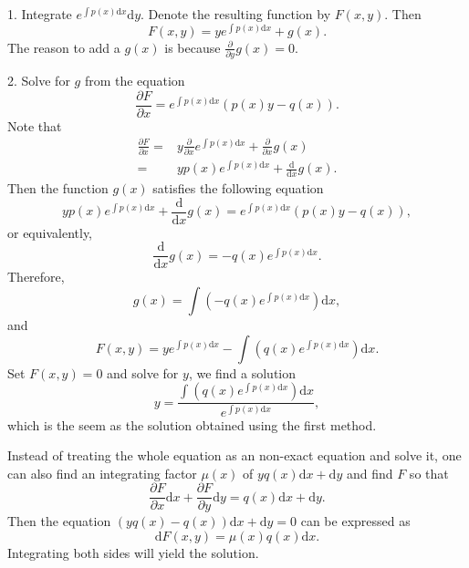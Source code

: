 \begin{subappendices}
1. Integrate $e^{\int p(x)\mathrm{d}x} \mathrm{d} y$. Denote the resulting function by $F(x, y)$. Then
    $$F(x, y)=ye^{\int p(x)\mathrm{d}x} + g(x).$$ The reason to add a $g(x)$ is because $\frac{\partial}{\partial y}g(x)=0$.

2. Solve for $g$ from the equation
    $$\frac{\partial F}{\partial x}=e^{\int p(x)\mathrm{d}x}(p(x)y-q(x)).$$
    Note that
    $$
    \begin{aligned}
    \frac{\partial F}{\partial x}=&y\frac{\partial}{\partial x}e^{\int p(x)\mathrm{d} x}+\frac{\partial}{\partial x}g(x)\\
    =&yp(x)e^{\int p(x)\mathrm{d} x}+\frac{\mathrm{d}}{\mathrm{d} x}g(x).
    \end{aligned}
    $$
  Then the function $g(x)$ satisfies the following equation
  $$yp(x)e^{\int p(x)\mathrm{d} x}+\frac{\mathrm{d}}{\mathrm{d} x}g(x)=e^{\int p(x)\mathrm{d}x}(p(x)y-q(x)),$$
  or equivalently,
  $$\frac{\mathrm{d}}{\mathrm{d} x}g(x)=-q(x)e^{\int p(x)\mathrm{d}x}.$$
  Therefore,
  $$g(x)=\int\left(-q(x)e^{\int p(x)\mathrm{d}x}\right)\mathrm{d}x,$$
  and
  $$F(x, y)=ye^{\int p(x)\mathrm{d}x}-\int\left(q(x)e^{\int p(x)\mathrm{d}x}\right)\mathrm{d}x.$$
  Set $F(x, y)=0$ and solve for $y$, we find a solution
  $$y=\dfrac{\int\left(q(x)e^{\int p(x)\mathrm{d}x}\right)\mathrm{d}x}{e^{\int p(x)\mathrm{d}x}},$$
  which is the seem as the solution obtained using the first method.

\begin{remark}
Instead of treating the whole equation as an non-exact equation and solve it, one can also find an integrating factor $\mu(x)$ of $yq(x)\mathrm{d} x + \mathrm{d} y$ and find $F$ so that
$$\frac{\partial F}{\partial x}\mathrm{d} x + \frac{\partial F}{\partial y}\mathrm{d} y=q(x)\mathrm{d} x + \mathrm{d} y.$$
Then the equation $(yq(x)-q(x))\mathrm{d} x + \mathrm{d} y=0$ can be expressed as
$$\mathrm{d} F(x, y)=\mu(x)q(x)\mathrm{d} x.$$
Integrating both sides will yield the solution.
\end{remark}

\end{subappendices}